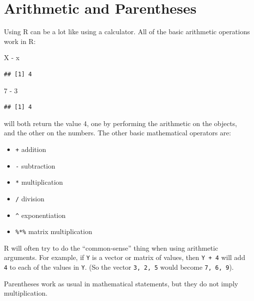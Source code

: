 \documentclass[
]{book}
\newenvironment{Shaded}{\begin{snugshade}}{\end{snugshade}}
\newcommand{\DecValTok}[1]{\textcolor[rgb]{0.00,0.00,0.81}{#1}}
\newcommand{\NormalTok}[1]{#1}
\newcommand{\SpecialCharTok}[1]{\textcolor[rgb]{0.00,0.00,0.00}{#1}}
\providecommand{\tightlist}{%
  \setlength{\itemsep}{0pt}\setlength{\parskip}{0pt}}
\begin{document}
\hypertarget{arithmetic-and-parentheses}{%
\section{Arithmetic and Parentheses}\label{arithmetic-and-parentheses}}

Using R can be a lot like using a calculator. All of the basic arithmetic operations work in R:

\begin{Shaded}
\begin{Highlighting}[]
\NormalTok{X }\SpecialCharTok{{-}}\NormalTok{ x}
\end{Highlighting}
\end{Shaded}

\begin{verbatim}
## [1] 4
\end{verbatim}

\begin{Shaded}
\begin{Highlighting}[]
\DecValTok{7} \SpecialCharTok{{-}} \DecValTok{3}
\end{Highlighting}
\end{Shaded}

\begin{verbatim}
## [1] 4
\end{verbatim}

will both return the value 4, one by performing the arithmetic on the objects, and the other on the numbers. The other basic mathematical operators are:

\begin{itemize}
\tightlist
\item
  \texttt{+} addition
\item
  \texttt{-} subtraction
\item
  \texttt{*} multiplication
\item
  \texttt{/} division
\item
  \texttt{\^{}} exponentiation
\item
  \texttt{\%*\%} matrix multiplication
\end{itemize}

R will often try to do the ``common-sense'' thing when using arithmetic arguments. For example, if \texttt{Y} is a vector or matrix of values, then \texttt{Y\ +\ 4} will add \texttt{4} to each of the values in \texttt{Y}. (So the vector \texttt{3,\ 2,\ 5} would become \texttt{7,\ 6,\ 9}).

Parentheses work as usual in mathematical statements, but they do not imply multiplication.
\end{document}
